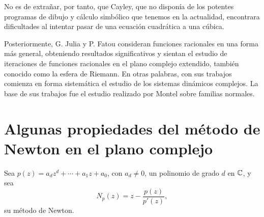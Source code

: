 No es de extrañar, por tanto, que Cayley, que no disponía de los potentes programas de dibujo y cálculo simbólico que tenemos en la actualidad, encontrara dificultades al intentar pasar de una ecuación cuadrática a una cúbica.

Posteriormente, G. Julia y P. Fatou consideran funciones racionales en una forma más general, obteniendo resultados significativos  y sientan el estudio de iteraciones de funciones racionales en el plano complejo extendido, también conocido como la esfera de Riemann. En otras palabras, con sus trabajos comienza en forma sistemática el estudio de los sistemas  dinámicos complejos. La base de sus trabajos fue el estudio realizado por Montel sobre familias normales.%




\section[Propiedades del método de Newton en $\C$]{Algunas propiedades del método de Newton en el plano complejo} 

Sea $ p(z) = a_d z^d + \cdots + a_1 z + a_0$, con $ a_d \ne
0$, un polinomio de grado $d $ en $\C$, y sea
$$
N_p(z) = z - \frac{p(z)}{p'(z)} ,
$$
su método de Newton.


